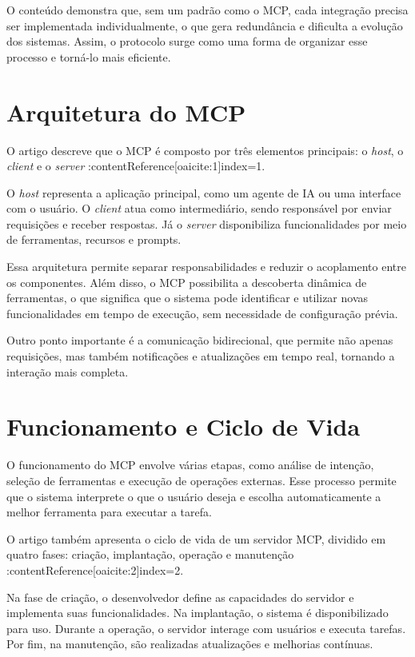 \documentclass[conference]{IEEEtran}
\begin{document}
O conteúdo demonstra que, sem um padrão como o MCP, cada integração precisa ser implementada individualmente, o que gera redundância e dificulta a evolução dos sistemas. Assim, o protocolo surge como uma forma de organizar esse processo e torná-lo mais eficiente.

\section{Arquitetura do MCP}

O artigo descreve que o MCP é composto por três elementos principais: o \textit{host}, o \textit{client} e o \textit{server} :contentReference[oaicite:1]{index=1}.

O \textit{host} representa a aplicação principal, como um agente de IA ou uma interface com o usuário. O \textit{client} atua como intermediário, sendo responsável por enviar requisições e receber respostas. Já o \textit{server} disponibiliza funcionalidades por meio de ferramentas, recursos e prompts.

Essa arquitetura permite separar responsabilidades e reduzir o acoplamento entre os componentes. Além disso, o MCP possibilita a descoberta dinâmica de ferramentas, o que significa que o sistema pode identificar e utilizar novas funcionalidades em tempo de execução, sem necessidade de configuração prévia.

Outro ponto importante é a comunicação bidirecional, que permite não apenas requisições, mas também notificações e atualizações em tempo real, tornando a interação mais completa.

\section{Funcionamento e Ciclo de Vida}

O funcionamento do MCP envolve várias etapas, como análise de intenção, seleção de ferramentas e execução de operações externas. Esse processo permite que o sistema interprete o que o usuário deseja e escolha automaticamente a melhor ferramenta para executar a tarefa.

O artigo também apresenta o ciclo de vida de um servidor MCP, dividido em quatro fases: criação, implantação, operação e manutenção :contentReference[oaicite:2]{index=2}.

Na fase de criação, o desenvolvedor define as capacidades do servidor e implementa suas funcionalidades. Na implantação, o sistema é disponibilizado para uso. Durante a operação, o servidor interage com usuários e executa tarefas. Por fim, na manutenção, são realizadas atualizações e melhorias contínuas.
\end{document}
